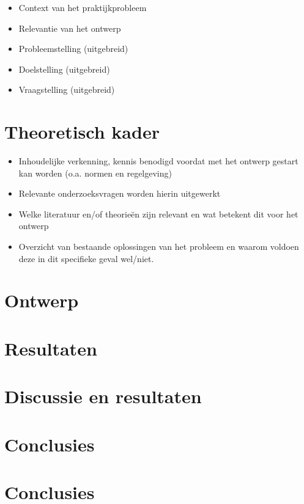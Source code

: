 \documentclass[10pt,a4paper]{article}
\begin{document}
\begin{itemize}
\setlength\itemsep{0em}
\item Context van het praktijkprobleem 
\item Relevantie van het ontwerp
\item Probleemstelling (uitgebreid) 
\item Doelstelling (uitgebreid) 
\item Vraagstelling (uitgebreid)
\end{itemize}

\newpage

\section{Theoretisch kader}
\begin{itemize}
\setlength\itemsep{0em}
\item Inhoudelijke verkenning, kennis benodigd voordat met het ontwerp gestart kan worden (o.a. normen en regelgeving)
\item Relevante onderzoeksvragen worden hierin uitgewerkt 
\item Welke literatuur en/of theorieën zijn relevant en wat betekent dit voor het ontwerp \item Overzicht van bestaande oplossingen van het probleem en waarom voldoen deze in dit specifieke geval wel/niet.
\end{itemize}
\newpage

\section{Ontwerp}



\section{Resultaten}


\section{Discussie en resultaten}

\section{Conclusies}

\section{Conclusies}
\end{document}
